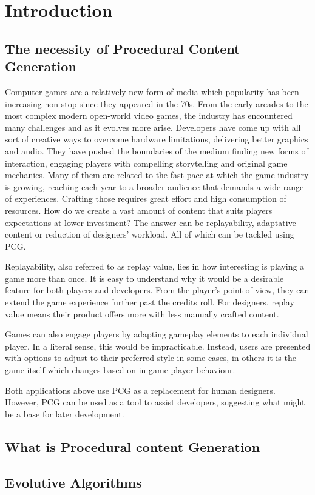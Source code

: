 \chapter{Introduction}\label{ch:introduction}

\section{The necessity of Procedural Content Generation}
Computer games are a relatively new form of media which popularity has been increasing non-stop since they appeared in the 70s. From the early arcades to the most complex modern open-world video games, the industry has encountered many challenges and as it evolves more arise. Developers have come up with all sort of creative ways to overcome hardware limitations, delivering better graphics and audio. They have pushed the boundaries of the medium finding new forms of interaction, engaging players with compelling storytelling and original game mechanics. Many of them are related to the fast pace at which the game industry is growing, reaching each year to a broader audience that demands a wide range of experiences. Crafting those requires great effort and high consumption of resources. How do we create a vast amount of content that suits players expectations at lower investment? The answer can be replayability, adaptative content or reduction of designers' workload. All of which can be tackled using \acf{PCG}.

Replayability, also referred to as replay value, lies in how interesting is playing a game more than once. It is easy to understand why it would be a desirable feature for both players and developers. From the player's point of view, they can extend the game experience further past the credits roll. For designers, replay value means their product offers more with less manually crafted content.

Games can also engage players by adapting gameplay elements to each individual player.  In a literal sense, this would be impracticable. Instead,  users are presented with options to adjust to their preferred style in some cases, in others it is the game itself which changes based on in-game player behaviour.

Both applications above use \ac{PCG} as a replacement for human designers. However, \ac{PCG} can be used as a tool to assist developers, suggesting what might be a base for later development.

\section{What is Procedural content Generation}
\section{Evolutive Algorithms}

